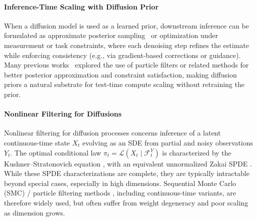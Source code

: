 \documentclass{article}
\theoremstyle{plain}
\theoremstyle{definition}
\theoremstyle{remark}
\begin{document}
\paragraph{Inference-Time Scaling with Diffusion Prior} When a diffusion model is used as a learned prior, downstream inference can be formulated as approximate posterior sampling~\cite{xu2024provably,wu2024principled,coeurdoux2024plug,bruna2024posterior} or optimization under measurement or task constraints, where each denoising step refines the estimate while enforcing consistency (e.g., via gradient-based corrections or guidance). Many previous works~\cite{wu2023practical,cardoso2023monte,singhal2025general,chen2025solving,ren2025driftlite,skreta2025feynman,uehara2025inference,he2025rne,he2025crepe,ou2025inference,chu2025split,hasan2026discrete,ma2025inference} explored the use of particle filters or related methods for better posterior approximation and constraint satisfaction, making diffusion priors a natural substrate for test-time compute scaling without retraining the prior.

\vspace{-0.1in}
\paragraph{Nonlinear Filtering for Diffusions} Nonlinear filtering for diffusion processes concerns inference of a latent continuous-time state $X_t$
evolving as an SDE from partial and noisy observations $Y_t$.
The optimal conditional law $\pi_t=\mathcal{L}(X_t \mid \mathcal{F}^Y_t)$ is characterized by the
Kushner--Stratonovich equation \cite{kushner1967dynamical,stratonovich1965conditional}, with an equivalent unnormalized Zakai SPDE \cite{zakai1969optimal}. While these SPDE characterizations are complete, they are typically intractable beyond special cases,
especially in high dimensions.
Sequential Monte Carlo (SMC) / particle filtering methods \cite{sottinen2008application,fearnhead2008particle,DelMoral2006_SMC,doucet2000sequential,anonymous2026simple,zhu2026power}, including continuous-time variants, are therefore
widely used, but often suffer from weight degeneracy and poor scaling as dimension grows.
\end{document}
